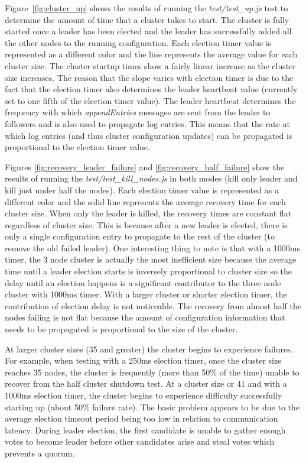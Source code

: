 \documentclass[conference,compsoc]{./IEEEtran/IEEEtran}
\begin{document}
Figure~\ref{fig:cluster_up} shows the results of running the
\emph{test/test\_up.js} test to determine the amount of time that
a cluster takes to start. The cluster is fully started once a
leader has been elected and the leader has successfully added all the
other nodes to the running configuration. Each election timer value
is represented as a different color and the line represents the
average value for each cluster size. The cluster startup times show
a fairly linear increase as the cluster size increases. The reason
that the slope varies with election timer is due to the fact that the
election timer also determines the leader heartbeat value (currently
set to one fifth of the election timer value). The leader heartbeat
determines the frequency with which \emph{appendEntries} messages are
sent from the leader to followers and is also used to propagate log
entries.  This means that the rate at which log entries (and thus
cluster configuration updates) can be propagated is proportional to
the election timer value.

Figures \ref{fig:recovery_leader_failure} and
\ref{fig:recovery_half_failure} show the results of running the
\emph{test/test\_kill\_nodes.js} in both modes (kill only leader and
kill just under half the nodes). Each election timer value is
represented as a different color and the solid line represents the
average recovery time for each cluster size. When only the leader is
killed, the recovery times are constant flat regardless of cluster
size. This is because after a new leader is elected, there is only
a single configuration entry to propagate to the rest of the cluster
(to remove the old failed leader). One interesting thing to note is
that with a 1000ms timer, the 3 node cluster is actually the most
inefficient size because the average time until a leader election
starts is inversely proportional to cluster size so the delay until an
election happens is a significant contributor to the three node
cluster with 1000ms timer. With a larger cluster or shorter election
timer, the contribution of election delay is not noticeable. The
recovery from almost half the nodes failing is not flat because the
amount of configuration information that needs to be propagated is
proportional to the size of the cluster.

At larger cluster sizes (35 and greater) the cluster begins to
experience failures. For example, when testing with a 250ms election
timer, once the cluster size reaches 35 nodes, the cluster is
frequently (more than 50\% of the time) unable to recover from the
half cluster shutdown test. At a cluster size or 41 and with a 1000ms
election timer, the cluster begins to experience difficulty
successfully starting up (about 50\% failure rate). The basic problem
appears to be due to the average election timeout period being too low
in relation to communication latency. During leader election, the
first candidate is unable to gather enough votes to become leader
before other candidates arise and steal votes which prevents a quorum.
\end{document}
